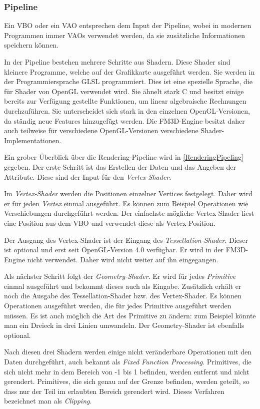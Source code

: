 \subsubsection{Pipeline}
Ein \ac{VBO} oder ein \ac{VAO} entsprechen dem Input der Pipeline, wobei in modernen Programmen immer \acp{VAO} verwendet werden, da sie zusätzliche Informationen speichern können.

In der Pipeline bestehen mehrere Schritte aus Shadern. Diese Shader sind kleinere Programme, welche auf der Grafikkarte ausgeführt werden. Sie werden in der Programmiersprache GLSL programmiert. 
Dies ist eine spezielle Sprache, die für Shader von OpenGL verwendet wird. Sie ähnelt stark C und besitzt einige bereits zur Verfügung gestellte Funktionen, um linear algebraische Rechnungen durchzuführen. 
Sie unterscheidet sich stark in den einzelnen OpenGL-Versionen, da ständig neue Features hinzugefügt werden. Die FM3D-Engine besitzt daher auch teilweise für verschiedene OpenGL-Versionen verschiedene Shader-Implementationen.

Ein grober Überblick über die Rendering-Pipeline wird in \cref{RenderingPipeling} gegeben. Der erste Schritt ist das Erstellen der Daten und das Angeben der Attribute. Diese sind der Input für den \textit{Vertex-Shader}. 

Im \textit{Vertex-Shader} werden die Positionen einzelner Vertices festgelegt. Daher wird er für jeden \textit{Vertex} einmal ausgeführt. Es können zum Beispiel Operationen wie Verschiebungen durchgeführt werden. Der einfachste mögliche Vertex-Shader liest eine Position aus dem \ac{VBO} und verwendet diese als Vertex-Position. 

Der Ausgang des Vertex-Shader ist der Eingang des \textit{Tessellation-Shader}. Dieser ist optional und erst seit OpenGL-Version 4.0 verfügbar. Er wird in der FM3D-Engine nicht verwendet. Daher wird nicht weiter auf ihn eingegangen.

Als nächster Schritt folgt der \textit{Geometry-Shader}. Er wird für jedes \textit{Primitive} einmal ausgeführt und bekommt dieses auch als Eingabe. 
Zusätzlich erhält er noch die Ausgabe des Tessellation-Shader bzw. des Vertex-Shader. Es können Operationen ausgeführt werden, die für jedes Primitive ausgeführt werden müssen. Es ist auch möglich die Art des Primitive zu ändern: zum Beispiel könnte man ein Dreieck in drei Linien umwandeln. Der Geometry-Shader ist ebenfalls optional.

Nach diesen drei Shadern werden einige nicht veränderbare Operationen mit den Daten durchgeführt, auch bekannt als \textit{Fixed Function Processing}. 
Primitives, die sich nicht mehr in dem Bereich von -1 bis 1 befinden, werden entfernt und nicht gerendert. Primitives, die sich genau auf der Grenze befinden, werden geteilt, so dass nur der Teil im erlaubten Bereich gerendert wird. Dieses Verfahren bezeichnet man als \textit{Clipping}.

